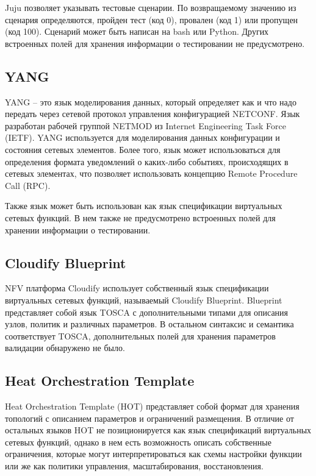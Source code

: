 \documentclass[oneside,final,14pt,a4paper]{extreport}
\begin{document}
Juju позволяет указывать тестовые сценарии. По возвращаемому значению из сценария определяются, пройден тест (код 0), провален (код 1) или пропущен (код 100). Сценарий может быть написан на bash\cite{} или Python\cite{}. Других встроенных полей для хранения информации о тестировании не предусмотрено.

\subsection{YANG}
YANG\cite{bib:rfc:yang} -- это язык моделирования данных, который определяет как и что надо передать через сетевой протокол управления конфигурацией NETCONF\cite{bib:rfc:netconf}. Язык разработан рабочей группой NETMOD из Internet Engineering Task Force (IETF). YANG используется для моделирования данных конфигурации и состояния сетевых элементов. Более того, язык может использоваться для определения формата уведомлений о каких-либо событиях, происходящих в сетевых элементах, что позволяет использовать концепцию Remote Procedure Call (RPC).

Также язык может быть использован как язык спецификации виртуальных сетевых функций. В нем также не предусмотрено встроенных полей для хранении информации о тестировании.


\subsection{Cloudify Blueprint}
NFV платформа Cloudify использует собственный язык спецификации виртуальных сетевых функций, называемый Cloudify Blueprint\cite{bib:blueprint}. Blueprint представляет собой язык TOSCA с дополнительными типами для описания узлов, политик и различных параметров.
В остальном синтаксис и семантика соответствует TOSCA, дополнительных полей для хранения параметров валидации обнаружено не было.

\subsection{Heat Orchestration Template}
Heat Orchestration Template\cite{bib:hot} (HOT) представляет собой формат для хранения топологий с описанием параметров и ограничений размещения. В отличие от остальных языков HOT не позиционируется как язык спецификаций виртуальных сетевых функций, однако в нем есть возможность описать собственные ограничения, которые могут интерпретироваться как схемы настройки функции или же как политики управления, масштабирования, восстановления.
\end{document}
